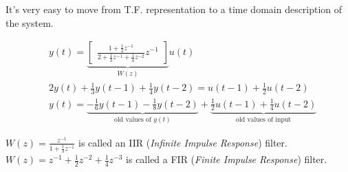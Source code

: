 It's very easy to move from T.F. representation to a time domain description of the system.

\begin{exa}
    \begin{align*}
        & y(t) = \underbrace{\begin{bmatrix}
            \frac{1+\frac{1}{2}z^{-1}}{2+\frac{1}{3}z^{-1}+\frac{1}{4}z^{-2}} z^{-1}
        \end{bmatrix}}_{W(z)} u(t) \\
        & 2y(t) + \frac{1}{3}y(t-1) + \frac{1}{4}y(t-2) = u(t-1) + \frac{1}{2}u(t-2) \\
        & y(t) = \underbrace{-\frac{1}{6}y(t-1) - \frac{1}{8}y(t-2)}_\text{old values of $y(t)$} + \underbrace{\frac{1}{2}u(t-1) + \frac{1}{4}u(t-2)}_\text{old values of input}
    \end{align*}

\end{exa}
\begin{rem}
    $\displaystyle W(z) = \frac{z^{-1}}{1 + \frac{1}{3}z^{-1}}$ is called an IIR (\emph{Infinite Impulse Response}) filter.\\
    $\displaystyle W(z) = z^{-1} + \frac{1}{2}z^{-2} + \frac{1}{4}z^{-3}$ is called a FIR (\emph{Finite Impulse Response}) filter.
\end{rem}
